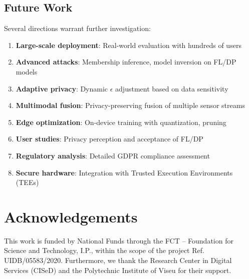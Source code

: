 \documentclass[conference]{IEEEtran}
\begin{document}
\subsection{Future Work}

Several directions warrant further investigation:

\begin{enumerate}
    \item \textbf{Large-scale deployment}: Real-world evaluation with hundreds of users
    \item \textbf{Advanced attacks}: Membership inference, model inversion on FL/DP models
    \item \textbf{Adaptive privacy}: Dynamic $\epsilon$ adjustment based on data sensitivity
    \item \textbf{Multimodal fusion}: Privacy-preserving fusion of multiple sensor streams
    \item \textbf{Edge optimization}: On-device training with quantization, pruning
    \item \textbf{User studies}: Privacy perception and acceptance of FL/DP
    \item \textbf{Regulatory analysis}: Detailed GDPR compliance assessment
    \item \textbf{Secure hardware}: Integration with Trusted Execution Environments (TEEs)
\end{enumerate}

\section*{Acknowledgements}
This work is funded by National Funds through the FCT – Foundation for Science and Technology, I.P., within the scope of the project Ref. UIDB/05583/2020. Furthermore, we thank the Research Center in Digital Services (CISeD) and the Polytechnic Institute of Viseu for their support.



\end{document}
